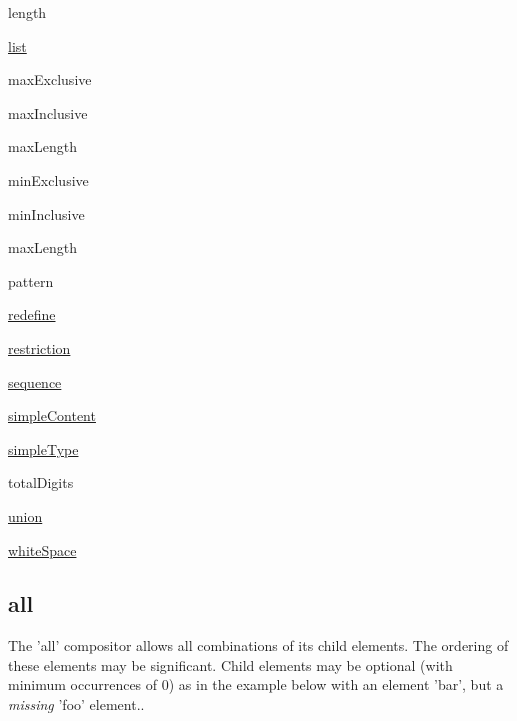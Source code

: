 \begin{DoxyItemize}
\item length
\item \hyperlink{list}{list}
\end{DoxyItemize}


\begin{DoxyItemize}
\item maxExclusive
\item maxInclusive
\item maxLength
\item minExclusive
\item minInclusive
\item maxLength
\end{DoxyItemize}


\begin{DoxyItemize}
\item pattern
\end{DoxyItemize}


\begin{DoxyItemize}
\item \hyperlink{redefine}{redefine}
\item \hyperlink{restriction}{restriction}
\end{DoxyItemize}


\begin{DoxyItemize}
\item \hyperlink{sequence}{sequence}
\item \hyperlink{simplecontent}{simpleContent}
\item \hyperlink{simpletype}{simpleType}
\end{DoxyItemize}


\begin{DoxyItemize}
\item totalDigits
\end{DoxyItemize}


\begin{DoxyItemize}
\item \hyperlink{union}{union}
\end{DoxyItemize}


\begin{DoxyItemize}
\item \hyperlink{whitespace}{whiteSpace} 
\end{DoxyItemize}\hypertarget{all}{}\subsection{all}\label{all}
The 'all' compositor allows all combinations of its child elements. The ordering of these elements may be significant. Child elements may be optional (with minimum occurrences of 0) as in the example below with an element 'bar', but a {\itshape missing\/} 'foo' element..


